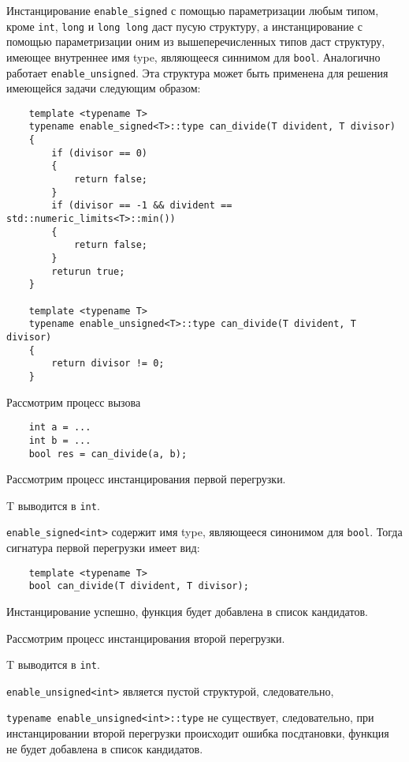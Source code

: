 	Инстанцирование \texttt{enable_signed} с помощью параметризации любым типом, кроме \texttt{int}, \texttt{long} и \texttt{long long} даст пусую структуру, а инстанцирование с помощью параметризации оним из вышеперечисленных типов даст структуру, имеющее внутреннее имя type, являющееся синнимом для \texttt{bool}. Аналогично работает \texttt{enable_unsigned}. Эта структура может быть применена для решения имеющейся задачи следующим образом:
	
	\begin{verbatim}
	template <typename T>
	typename enable_signed<T>::type can_divide(T divident, T divisor)
	{
		if (divisor == 0)
		{
			return false;
		}		
		if (divisor == -1 && divident == std::numeric_limits<T>::min())
		{
			return false;
		}
		returun true;
	}
	
	template <typename T>
	typename enable_unsigned<T>::type can_divide(T divident, T divisor)
	{
		return divisor != 0;
	}
	\end{verbatim}
	
	Рассмотрим процесс вызова
	
	\begin{verbatim}
	int a = ...
	int b = ...
	bool res = can_divide(a, b);
	\end{verbatim}
	
	Рассмотрим процесс инстанцирования первой перегрузки.
	
	T выводится в \texttt{int}.
	
	\texttt{enable_signed<int>} содержит имя type, являющееся синонимом для \texttt{bool}. Тогда сигнатура первой перегрузки имеет вид:
	
	\begin{verbatim}
	template <typename T>
	bool can_divide(T divident, T divisor);
	\end{verbatim}
	
	Инстанцирование успешно, функция будет добавлена в список кандидатов.
	
	Рассмотрим процесс инстанцирования второй перегрузки.
	
	T выводится в \texttt{int}.
	
	\texttt{enable_unsigned<int>} является пустой структурой, следовательно, 
	
	\texttt{typename enable_unsigned<int>::type} не существует, следовательно, при инстанцировании второй перегрузки происходит ошибка посдтановки, функция не будет добавлена в список кандидатов.
	
